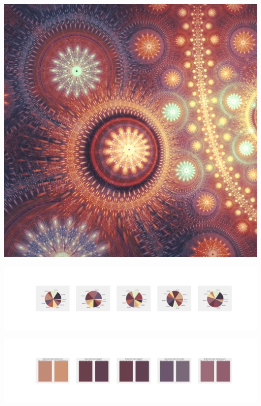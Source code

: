 \documentclass[11pt]{article}
\begin{document}
\begin{landscape}
    \begin{center}
    \includegraphics[width=\textwidth]{./nbimg/file (305).jpg}
    \end{center}

    \begin{center}
    \includegraphics[width=250mm]{./nbimg/pie-229.jpg}
    \end{center}

    \begin{center}
    \includegraphics[width=250mm]{./nbimg/peak-229.jpg}
    \end{center}
    


\end{landscape}
\end{document}
